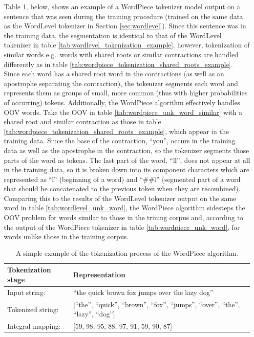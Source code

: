 \documentclass[12pt]{article}
\begin{document}
Table \ref{tab:wordpiece_tokenization_example}, below, shows an example of a WordPiece tokenizer model output on a sentence that was seen during the
training procedure (trained on the same data as the WordLevel tokenizer in Section \ref{sec:wordlevel}). Since this sentence was in the training data,
the segmentation is identical to that of the WordLevel tokenizer in table \ref{tab:wordlevel_tokenization_example}, however, tokenization of similar
words e.g.~words with shared roots or similar contractions are handled differently as in table \ref{tab:wordpiece_tokenization_shared_roots_example}.
Since each word has a shared root word in the contractions (as well as an apostrophe separating the contraction), the tokenizer segments each word and
represents them as groups of small, more common (thus with higher probabilities of occurring) tokens. Additionally, the WordPiece algorithm
effectively handles OOV words. Take the OOV in table \ref{tab:wordpiece_unk_word_similar} with a shared root and similar contraction as those in table
\ref{tab:wordpiece_tokenization_shared_roots_example}, which appear in the training data. Since the base of the contraction, ``you'', occurs in the
training data as well as the apostrophe in the contraction, so the tokenizer segments those parts of the word as tokens. The last part of the word,
``ll'', does not appear at all in the training data, so it is broken down into its component characters which are represented as ``l'' (beginning of
a word) and ``\#\#l'' (segmented part of a word that should be concatenated to the previous token when they are recombined). Comparing this to the
results of the WordLevel tokenizer output on the same word in table \ref{tab:wordlevel_unk_word}, the WordPiece algorithm sidesteps the OOV problem
for words similar to those in the trining corpus and, according to the output of the WordPiece tokenizer in table \ref{tab:wordpiece_unk_word}, for
words unlike those in the training corpus.

\begin{table}[!t]
    \centering
    \begin{tabular}{l l}
        \toprule
        Tokenization stage & Representation                                                                            \\
        \midrule
        Input string:      & ``the quick brown fox jumps over the lazy dog''                                           \\
        Tokenized string:  & [``the'', ``quick'', ``brown'', ``fox'', ``jumps'', ``over'', ``the'', ``lazy'', ``dog''] \\
        Integral mapping:  & [59, 98, 95, 88, 97, 91, 59, 90, 87]                                                      \\
        \bottomrule
    \end{tabular}
    \caption{A simple example of the tokenization process of the WordPiece algorithm.}
    \label{tab:wordpiece_tokenization_example}
\end{table}
\end{document}
